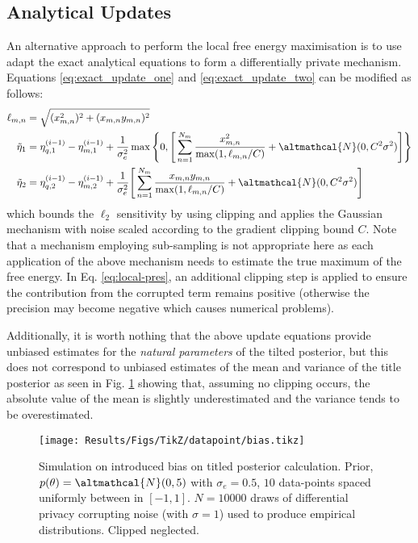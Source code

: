 \subsection{Analytical Updates}
An alternative approach to perform the local free energy maximisation is to use adapt the exact analytical equations to form a differentially private mechanism. Equations \eqref{eq:exact_update_one} and \eqref{eq:exact_update_two} can be modified as follows:
\begin{align}
\ell_{m, n} &= \sqrt{(x_{m, n}^2)^2 + (x_{m,n} y_{m,n})^2} \\
\tilde{\eta}_1 &= \eta_{q, 1}^{(i-1)} - \eta_{m, 1}^{(i-1)} + \frac{1}{\sigma_e^2} \max \Bigg \lbrace 0, \Bigg[ \sum_{n=1}^{N_m} \frac{x_{m,n}^2}{\max(1, \ell_{m,n} / C)} + \altmathcal{N}(0, C^2 \sigma^2) \Bigg] \Bigg \rbrace \label{eq:local-pres}\\ 
\tilde{\eta}_2 &= \eta_{q, 2}^{(i-1)} - \eta_{m, 2}^{(i-1)} + \frac{1}{\sigma_e^2} \Bigg[ \sum_{n=1}^{N_m} \frac{x_{m,n}y_{m,n}}{\max(1, \ell_{m,n} / C)} + \altmathcal{N}(0, C^2 \sigma^2) \Bigg]
\end{align}
which bounds the $\ell_2$ sensitivity by using clipping and applies the Gaussian mechanism with noise scaled according to the gradient clipping bound $C$. Note that a mechanism employing sub-sampling is not appropriate here as each application of the above mechanism needs to estimate the true maximum of the free energy. In Eq. \ref{eq:local-pres}, an additional clipping step is applied to ensure the contribution from the corrupted term remains positive (otherwise the precision may become negative which causes numerical problems).

Additionally, it is worth nothing that the above update equations provide unbiased estimates  for the \emph{natural parameters} of the tilted posterior, but this does not correspond to unbiased estimates of the mean and variance of the title posterior as seen in Fig. \ref{fig:results-local-bias} showing that, assuming no clipping occurs, the absolute value of the mean is slightly underestimated and the variance tends to be overestimated. 

\begin{figure}
	\texttt{[image: Results/Figs/TikZ/datapoint/bias.tikz]}
	\centering
	\caption{\label{fig:results-local-bias}Simulation on introduced bias on titled posterior calculation. Prior, $p(\theta) = \altmathcal{N}(0, 5)$ with $\sigma_e = 0.5$, $10$ data-points spaced uniformly between in $[-1, 1]$. $N=10000$ draws of differential privacy corrupting noise (with $\sigma=1$) used to produce empirical distributions. Clipped neglected. }
\end{figure}

